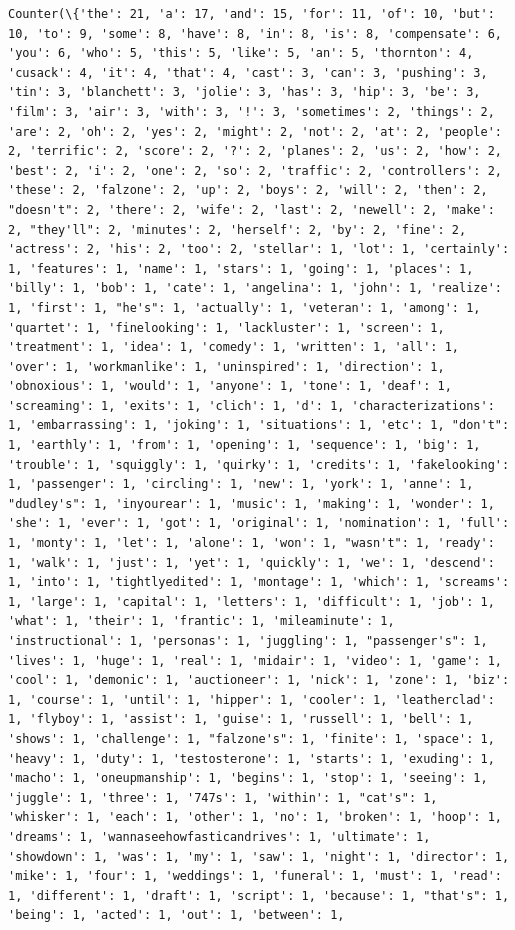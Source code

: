 \documentclass[11pt]{article}
\begin{document}
    \begin{Verbatim}[commandchars=\\\{\}]
Counter(\{'the': 21, 'a': 17, 'and': 15, 'for': 11, 'of': 10, 'but': 10, 'to': 9, 'some': 8, 'have': 8, 'in': 8, 'is': 8, 'compensate': 6, 'you': 6, 'who': 5, 'this': 5, 'like': 5, 'an': 5, 'thornton': 4, 'cusack': 4, 'it': 4, 'that': 4, 'cast': 3, 'can': 3, 'pushing': 3, 'tin': 3, 'blanchett': 3, 'jolie': 3, 'has': 3, 'hip': 3, 'be': 3, 'film': 3, 'air': 3, 'with': 3, '!': 3, 'sometimes': 2, 'things': 2, 'are': 2, 'oh': 2, 'yes': 2, 'might': 2, 'not': 2, 'at': 2, 'people': 2, 'terrific': 2, 'score': 2, '?': 2, 'planes': 2, 'us': 2, 'how': 2, 'best': 2, 'i': 2, 'one': 2, 'so': 2, 'traffic': 2, 'controllers': 2, 'these': 2, 'falzone': 2, 'up': 2, 'boys': 2, 'will': 2, 'then': 2, "doesn't": 2, 'there': 2, 'wife': 2, 'last': 2, 'newell': 2, 'make': 2, "they'll": 2, 'minutes': 2, 'herself': 2, 'by': 2, 'fine': 2, 'actress': 2, 'his': 2, 'too': 2, 'stellar': 1, 'lot': 1, 'certainly': 1, 'features': 1, 'name': 1, 'stars': 1, 'going': 1, 'places': 1, 'billy': 1, 'bob': 1, 'cate': 1, 'angelina': 1, 'john': 1, 'realize': 1, 'first': 1, "he's": 1, 'actually': 1, 'veteran': 1, 'among': 1, 'quartet': 1, 'finelooking': 1, 'lackluster': 1, 'screen': 1, 'treatment': 1, 'idea': 1, 'comedy': 1, 'written': 1, 'all': 1, 'over': 1, 'workmanlike': 1, 'uninspired': 1, 'direction': 1, 'obnoxious': 1, 'would': 1, 'anyone': 1, 'tone': 1, 'deaf': 1, 'screaming': 1, 'exits': 1, 'clich': 1, 'd': 1, 'characterizations': 1, 'embarrassing': 1, 'joking': 1, 'situations': 1, 'etc': 1, "don't": 1, 'earthly': 1, 'from': 1, 'opening': 1, 'sequence': 1, 'big': 1, 'trouble': 1, 'squiggly': 1, 'quirky': 1, 'credits': 1, 'fakelooking': 1, 'passenger': 1, 'circling': 1, 'new': 1, 'york': 1, 'anne': 1, "dudley's": 1, 'inyourear': 1, 'music': 1, 'making': 1, 'wonder': 1, 'she': 1, 'ever': 1, 'got': 1, 'original': 1, 'nomination': 1, 'full': 1, 'monty': 1, 'let': 1, 'alone': 1, 'won': 1, "wasn't": 1, 'ready': 1, 'walk': 1, 'just': 1, 'yet': 1, 'quickly': 1, 'we': 1, 'descend': 1, 'into': 1, 'tightlyedited': 1, 'montage': 1, 'which': 1, 'screams': 1, 'large': 1, 'capital': 1, 'letters': 1, 'difficult': 1, 'job': 1, 'what': 1, 'their': 1, 'frantic': 1, 'mileaminute': 1, 'instructional': 1, 'personas': 1, 'juggling': 1, "passenger's": 1, 'lives': 1, 'huge': 1, 'real': 1, 'midair': 1, 'video': 1, 'game': 1, 'cool': 1, 'demonic': 1, 'auctioneer': 1, 'nick': 1, 'zone': 1, 'biz': 1, 'course': 1, 'until': 1, 'hipper': 1, 'cooler': 1, 'leatherclad': 1, 'flyboy': 1, 'assist': 1, 'guise': 1, 'russell': 1, 'bell': 1, 'shows': 1, 'challenge': 1, "falzone's": 1, 'finite': 1, 'space': 1, 'heavy': 1, 'duty': 1, 'testosterone': 1, 'starts': 1, 'exuding': 1, 'macho': 1, 'oneupmanship': 1, 'begins': 1, 'stop': 1, 'seeing': 1, 'juggle': 1, 'three': 1, '747s': 1, 'within': 1, "cat's": 1, 'whisker': 1, 'each': 1, 'other': 1, 'no': 1, 'broken': 1, 'hoop': 1, 'dreams': 1, 'wannaseehowfasticandrives': 1, 'ultimate': 1, 'showdown': 1, 'was': 1, 'my': 1, 'saw': 1, 'night': 1, 'director': 1, 'mike': 1, 'four': 1, 'weddings': 1, 'funeral': 1, 'must': 1, 'read': 1, 'different': 1, 'draft': 1, 'script': 1, 'because': 1, "that's": 1, 'being': 1, 'acted': 1, 'out': 1, 'between': 1, 
\end{Verbatim}
\end{document}

